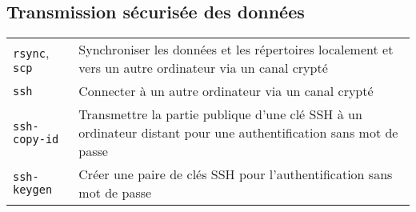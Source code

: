\documentclass[10pt,a4paper]{article}
\begin{document}
\begin{multicols}{2}
\section{Transmission sécurisée des données}
\begin{tabular}{ p{2.5cm} p{8.5cm} }
  \hline
  \texttt{rsync}, \texttt{scp} & Synchroniser les données et les répertoires localement et vers un autre ordinateur via un canal crypté \\
  \rowcolor{Gray}
  \texttt{ssh} & Connecter à un autre ordinateur via un canal crypté\\
  \texttt{ssh-copy-id} & Transmettre la partie publique d'une clé SSH à un ordinateur distant pour une authentification sans mot de passe\\
  \rowcolor{Gray}
  \texttt{ssh-keygen} & Créer une paire de clés SSH pour l'authentification sans mot de passe\\
  \hline
\end{tabular}


\columnbreak


\end{multicols}
\end{document}

